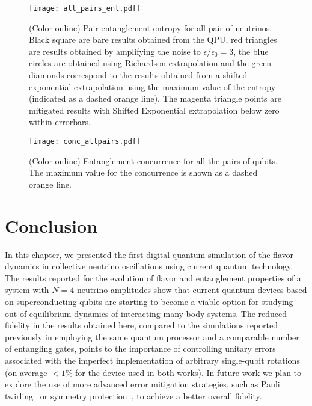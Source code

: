 \documentclass[Dual]{msu-thesis}
\begin{document}
\begin{figure}[H]
 \centering
 \texttt{[image: all\_pairs\_ent.pdf]}
 \caption{(Color online) Pair entanglement entropy for all pair of neutrinos. Black square are bare results obtained from the QPU, red triangles are results obtained by amplifying the noise to $\epsilon/\epsilon_0=3$, the blue circles are obtained using Richardson extrapolation and the green diamonds correspond to the results obtained from a shifted exponential extrapolation using the maximum value of the entropy (indicated as a dashed orange line). The magenta triangle points are mitigated results with Shifted Exponential extrapolation below zero within errorbars.}
\label{fig:pair_ent_all}
\end{figure}

\begin{figure}[H]
 \centering
 \texttt{[image: conc\_allpairs.pdf]}
 \caption{(Color online) Entanglement concurrence for all the pairs of qubits. The maximum value for the concurrence is shown as a dashed orange line.}
\label{fig:conc_pair_1}
\end{figure}

\section{Conclusion}
\label{sec:conclusion}

In this chapter, we presented the first digital quantum simulation of the flavor dynamics in collective neutrino oscillations using current quantum technology. The results reported for the evolution of flavor and entanglement properties of a system with $N=4$ neutrino amplitudes show that current quantum devices based on superconducting qubits are starting to become a viable option for studying out-of-equilibrium dynamics of interacting many-body systems. The reduced fidelity in the results obtained here, compared to the simulations reported previously in \cite{Roggero_nptodg} employing the same quantum processor and a comparable number of entangling gates, points to the importance of controlling unitary errors associated with the imperfect implementation of arbitrary single-qubit rotations (on average $<1\%$ for the device used in both works). In future work we plan to explore the use of more advanced error mitigation strategies, such as Pauli twirling~\cite{Wallman2016} or symmetry protection~\cite{Tran2021}, to achieve a better overall fidelity.
\end{document}
